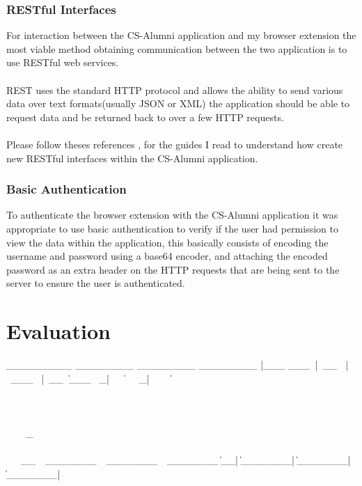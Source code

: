\documentclass{article}
\begin{document}
\subsubsection{RESTful Interfaces}

For interaction between the CS-Alumni application and my browser extension the most viable method obtaining communication between the two application is to use RESTful web services.\\
\\
REST uses the standard HTTP protocol and allows the ability to send various data over text formats(usually JSON or XML) the application should be able to request data and be returned back to over a few HTTP requests. \\
\\
Please follow theses references \cite[see reference][page \pageref{LastPage}]{bara:2013:online}, \cite[see reference][page \pageref{LastPage}]{saa:2013:online} for the guides I read to understand how create new RESTful interfaces within the CS-Alumni application.

\subsubsection{Basic Authentication}

To authenticate the browser extension with the CS-Alumni application it was appropriate to use basic authentication to verify if the user had permission to view the data within the application, this basically consists of encoding the username and password using a base64 encoder, and attaching the encoded password as an extra header on the HTTP requests that are being sent to the server to ensure the user is authenticated. \cite[see reference][page \pageref{LastPage}]{wp:2014:online}

\newpage
\section{Evaluation}

\iffalse
 _________    ________      ________      ________     
|\___   ___\ |\   __  \    |\   ___ \    |\   __  \    
\|___ \  \_| \ \  \|\  \   \ \  \_|\ \   \ \  \|\  \   
     \ \  \   \ \  \\\  \   \ \  \ \\ \   \ \  \\\  \  
      \ \  \   \ \  \\\  \   \ \  \_\\ \   \ \  \\\  \ 
       \ \__\   \ \_______\   \ \_______\   \ \_______\
        \|__|    \|_______|    \|_______|    \|_______|       
\end{document}
